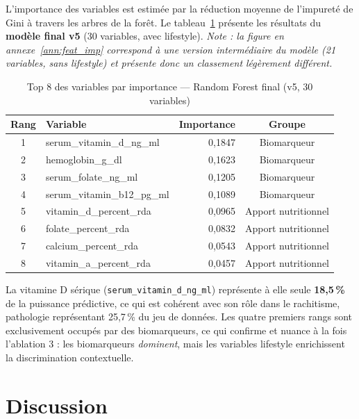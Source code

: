 \documentclass[12pt,a4paper]{article}
\begin{document}
L'importance des variables est estimée par la réduction moyenne de l'impureté
de Gini à travers les arbres de la forêt. Le tableau~\ref{tab:feat_imp}
présente les résultats du \textbf{modèle final v5} (30 variables, avec
lifestyle). \emph{Note : la figure en annexe~\ref{ann:feat_imp} correspond à
une version intermédiaire du modèle (21 variables, sans lifestyle) et présente
donc un classement légèrement différent.}

\begin{table}[H]
\centering
\caption{Top 8 des variables par importance --- Random Forest final (v5, 30 variables)}
\label{tab:feat_imp}
\begin{tabular}{clrc}
\toprule
\textbf{Rang} & \textbf{Variable} & \textbf{Importance} & \textbf{Groupe} \\
\midrule
1 & serum\_vitamin\_d\_ng\_ml   & 0,1847 & Biomarqueur \\
2 & hemoglobin\_g\_dl           & 0,1623 & Biomarqueur \\
3 & serum\_folate\_ng\_ml       & 0,1205 & Biomarqueur \\
4 & serum\_vitamin\_b12\_pg\_ml & 0,1089 & Biomarqueur \\
5 & vitamin\_d\_percent\_rda    & 0,0965 & Apport nutritionnel \\
6 & folate\_percent\_rda        & 0,0832 & Apport nutritionnel \\
7 & calcium\_percent\_rda       & 0,0543 & Apport nutritionnel \\
8 & vitamin\_a\_percent\_rda    & 0,0457 & Apport nutritionnel \\
\bottomrule
\end{tabular}
\end{table}

La vitamine D sérique (\texttt{serum\_vitamin\_d\_ng\_ml}) représente à elle
seule \textbf{18,5\,\%} de la puissance prédictive, ce qui est cohérent avec
son rôle dans le rachitisme, pathologie représentant 25,7\,\% du jeu de données.
Les quatre premiers rangs sont exclusivement occupés par des biomarqueurs, ce
qui confirme et nuance à la fois l'ablation 3 : les biomarqueurs \emph{dominent},
mais les variables lifestyle enrichissent la discrimination contextuelle.

\section{Discussion}
\end{document}
